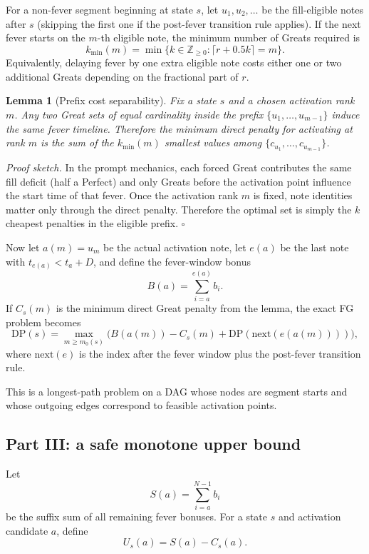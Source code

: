 \documentclass[11pt]{article}
\newtheorem{lemma}{Lemma}
\begin{document}
For a non-fever segment beginning at state $s$, let $u_1,u_2,\ldots$ be the fill-eligible notes after $s$ (skipping the first one if the post-fever transition rule applies). If the next fever starts on the $m$-th eligible note, the minimum number of Greats required is
\[
 k_{\min}(m) = \min\{k \in \mathbb{Z}_{\ge 0} : \lceil r + 0.5k \rceil = m\}.
\]
Equivalently, delaying fever by one extra eligible note costs either one or two additional Greats depending on the fractional part of $r$.

\begin{lemma}[Prefix cost separability]
Fix a state $s$ and a chosen activation rank $m$. Any two Great sets of equal cardinality inside the prefix $\{u_1,\ldots,u_{m-1}\}$ induce the same fever timeline. Therefore the minimum direct penalty for activating at rank $m$ is the sum of the $k_{\min}(m)$ smallest values among $\{c_{u_1},\ldots,c_{u_{m-1}}\}$.
\end{lemma}

\emph{Proof sketch.} In the prompt mechanics, each forced Great contributes the same fill deficit (half a Perfect) and only Greats before the activation point influence the start time of that fever. Once the activation rank $m$ is fixed, note identities matter only through the direct penalty. Therefore the optimal set is simply the $k$ cheapest penalties in the eligible prefix. \hfill$\square$

Now let $a(m)=u_m$ be the actual activation note, let $e(a)$ be the last note with $t_{e(a)} < t_a + D$, and define the fever-window bonus
\[
B(a) = \sum_{i=a}^{e(a)} b_i.
\]
If $C_s(m)$ is the minimum direct Great penalty from the lemma, the exact FG problem becomes
\[
\mathrm{DP}(s) = \max_{m \ge m_0(s)} \Big(B(a(m)) - C_s(m) + \mathrm{DP}(\mathrm{next}(e(a(m))))\Big),
\]
where $\mathrm{next}(e)$ is the index after the fever window plus the post-fever transition rule.

This is a longest-path problem on a DAG whose nodes are segment starts and whose outgoing edges correspond to feasible activation points.

\subsection{Part III: a safe monotone upper bound}

Let
\[
S(a) = \sum_{i=a}^{N-1} b_i
\]
be the suffix sum of all remaining fever bonuses. For a state $s$ and activation candidate $a$, define
\[
U_s(a) = S(a) - C_s(a).
\]
\end{document}
